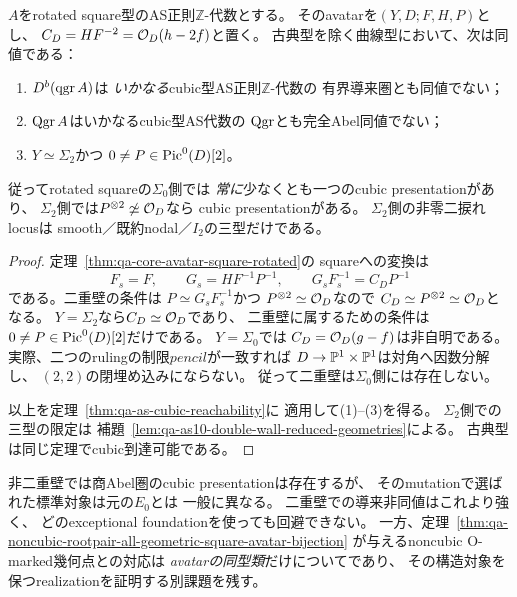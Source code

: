 \begin{corollary}
\label{cor:qa-as-cubic-rotated-sigma2-exception}
$A$をrotated square型のAS正則$\mathbb Z$-代数とする。
そのavatarを$(Y,D;F,H,P)$とし、
$C_D=HF^{-2}=\mathcal O_D(h-2f)$と置く。
古典型を除く曲線型において、次は同値である：
\begin{enumerate}
\item $D^b(\operatorname{qgr} A)$は
      \emph{いかなる}cubic型AS正則$\mathbb Z$-代数の
      有界導来圏とも同値でない；
\item $\operatorname{Qgr} A$はいかなるcubic型AS代数の
      $\operatorname{Qgr}$とも完全Abel同値でない；
\item $Y\simeq\Sigma_2$かつ
      $0\ne P\in\operatorname{Pic}^0(D)[2]$。
\end{enumerate}
従ってrotated squareの$\Sigma_0$側では
\emph{常に}少なくとも一つのcubic presentationがあり、
$\Sigma_2$側では$P^{\otimes2}\not\simeq\mathcal O_D$なら
cubic presentationがある。
$\Sigma_2$側の非零二捩れlocusは
smooth／既約nodal／$I_2$の三型だけである。
\end{corollary}
\begin{proof}
定理~\ref{thm:qa-core-avatar-square-rotated}の
squareへの変換は
\[
 F_s=F,\qquad G_s=HF^{-1}P^{-1},
 \qquad G_sF_s^{-1}=C_DP^{-1}
\]
である。二重壁の条件は
$P\simeq G_sF_s^{-1}$かつ
$P^{\otimes2}\simeq\mathcal O_D$なので
$C_D\simeq P^{\otimes2}\simeq\mathcal O_D$となる。
$Y=\Sigma_2$なら$C_D\simeq\mathcal O_D$であり、
二重壁に属するための条件は
$0\ne P\in\operatorname{Pic}^0(D)[2]$だけである。
$Y=\Sigma_0$では
$C_D=\mathcal O_D(g-f)$は非自明である。
実際、二つのrulingの制限$pencil$が一致すれば
$D\to\mathbb P^1\times\mathbb P^1$は対角へ因数分解し、
$(2,2)$の閉埋め込みにならない。
従って二重壁は$\Sigma_0$側には存在しない。

以上を定理~\ref{thm:qa-as-cubic-reachability}に
適用して(1)--(3)を得る。
$\Sigma_2$側での三型の限定は
補題~\ref{lem:qa-as10-double-wall-reduced-geometries}による。
古典型は同じ定理でcubic到達可能である。
\end{proof}

\begin{remark}[分類同型とheartの区別]
\label{rem:qa-as-cubic-obstruction-marking}
非二重壁では商Abel圏のcubic presentationは存在するが、
そのmutationで選ばれた標準対象は元の$E_0$とは
一般に異なる。
二重壁での導来非同値はこれより強く、
どのexceptional foundationを使っても回避できない。
一方、定理~\ref{thm:qa-noncubic-rootpair-all-geometric-square-avatar-bijection}
が与えるnoncubic O-marked幾何点との対応は
\emph{avatarの同型類}だけについてであり、
その構造対象を保つrealizationを証明する別課題を残す。
\end{remark}
